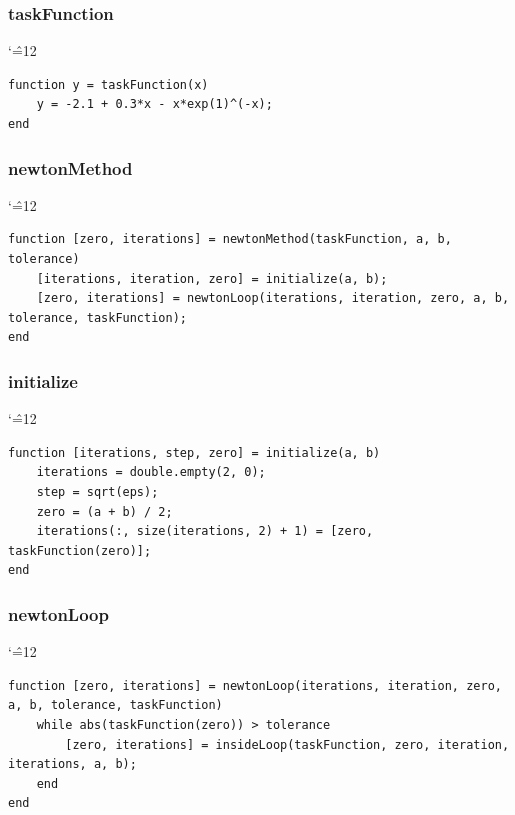 \documentclass[12pt]{report}
\newenvironment{simplechar}{%
   \catcode`\^=12
}{}
\begin{document}
\subsubsection{taskFunction}
\begin{simplechar}
\begin{lstlisting}
function y = taskFunction(x)
    y = -2.1 + 0.3*x - x*exp(1)^(-x);
end
\end{lstlisting}
\end{simplechar}

\subsubsection{newtonMethod}
\begin{simplechar}
\begin{lstlisting}
function [zero, iterations] = newtonMethod(taskFunction, a, b, tolerance)
    [iterations, iteration, zero] = initialize(a, b);
    [zero, iterations] = newtonLoop(iterations, iteration, zero, a, b, tolerance, taskFunction);
end
\end{lstlisting}
\end{simplechar}

\subsubsection{initialize}
\begin{simplechar}
\begin{lstlisting}
function [iterations, step, zero] = initialize(a, b)
    iterations = double.empty(2, 0);
    step = sqrt(eps);
    zero = (a + b) / 2;
    iterations(:, size(iterations, 2) + 1) = [zero, taskFunction(zero)];
end
\end{lstlisting}
\end{simplechar}

\subsubsection{newtonLoop}
\begin{simplechar}
\begin{lstlisting}
function [zero, iterations] = newtonLoop(iterations, iteration, zero, a, b, tolerance, taskFunction)
    while abs(taskFunction(zero)) > tolerance
        [zero, iterations] = insideLoop(taskFunction, zero, iteration, iterations, a, b);
    end
end
\end{lstlisting}
\end{simplechar}
\end{document}
